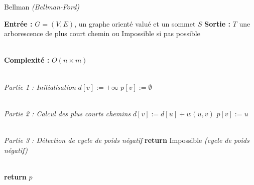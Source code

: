 \documentclass{article}      %
\begin{document}
\begin{algorithm} \caption{Bellman \textit{(Bellman-Ford)}}
\begin{algorithmic}

\State \textbf{Entrée :} $G = (V, E)$, un graphe orienté valué et un sommet $S$
\State \textbf{Sortie :} $T$ une arborescence de plus court chemin ou Impossible si pas possible

\\ \State \textbf{Complexité :} $O(n\times m)$

\\ \State \textit{Partie 1 : Initialisation}
    \State $d[v] := +\infty$
    \State $p[v] := \emptyset$
\EndFor


\\ \State \textit{Partie 2 : Calcul des plus courts chemins}
            \State $d[v] := d[u] + w(u, v)$
            \State $p[v] := u$
        \EndIf
    \EndFor
\EndFor


\\ \State \textit{Partie 3 : Détection de cycle de poids négatif}
    \State \textbf{return} Impossible \textit{(cycle de poids négatif)}
    \EndIf
\EndFor

\\ \State \textbf{return} $p$
\end{algorithmic}
\end{algorithm}
\end{document}
